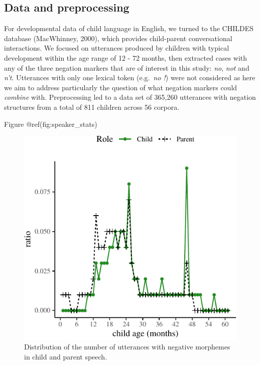\documentclass[10pt, letterpaper]{article}
\newenvironment{CodeChunk}{}{}
\begin{document}
\hypertarget{data-and-preprocessing}{%
\subsection{Data and preprocessing}\label{data-and-preprocessing}}

For developmental data of child language in English, we turned to the
CHILDES database (MacWhinney, 2000), which provides child-parent
conversational interactions. We focused on utterances produced by
children with typical development within the age range of 12 - 72
months, then extracted cases with any of the three negation markers that
are of interest in this study: \emph{no}, \emph{not} and \emph{n't}.
Utterances with only one lexical token (e.g.~\emph{no !}) were not
considered as here we aim to address particularly the question of what
negation markers could \emph{combine} with. Preprocessing led to a data
set of 365,260 utterances with negation structures from a total of 811
children across 56 corpora.

Figure @ref(fig:speaker\_stats)

\begin{CodeChunk}
\begin{figure}[H]

{\centering \includegraphics{figs/speaker_stats-1} 

}

\caption[Distribution of the number of utterances with negative morphemes in child and parent speech]{Distribution of the number of utterances with negative morphemes in child and parent speech.}\label{fig:speaker_stats}
\end{figure}
\end{CodeChunk}
\end{document}
